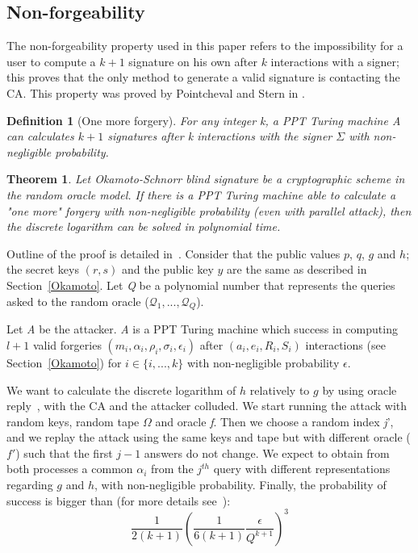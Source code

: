 \documentclass[conference]{IEEEtran}
\newtheorem{definition}{Definition}
\newtheorem{theorem}{Theorem}
\begin{document}
\subsection{Non-forgeability}
The non-forgeability property used in this paper refers to the impossibility for a user to compute a $k+1$ signature on his own after $k$ interactions with a signer; this proves that the only method to generate a valid signature is contacting the CA. This property was proved by Pointcheval and Stern in \cite{pointcheval1996provably}.

\begin{definition}[One more forgery]
For any integer \textit{k}, a PPT Turing machine \textit{A} can calculates $k+1$ signatures after \textit{k} interactions with the signer $\Sigma$ with non-negligible probability.  
\end{definition}

\begin{theorem}
Let Okamoto-Schnorr blind signature be a cryptographic scheme in the random oracle model. If there is a PPT Turing machine able to calculate a "one more" forgery with non-negligible probability (even with parallel attack), then the discrete logarithm can be solved in polynomial time.
\end{theorem}

\begin{IEEEproof}
Outline of the proof is detailed in~\cite{pointcheval1996provably}.
Consider that the public values $p$, $q$, $g$ and $h$; the secret keys $(r,s)$ and the public key $y$ are the same as described in Section~\ref{Okamoto}. Let \textit{Q} be a polynomial number that represents the queries asked to the random oracle ($\mathcal{Q}_1,...,\mathcal{Q}_Q$).

Let \textit{A} be the attacker. \textit{A} is a PPT Turing machine which success in computing  $l+1$ valid forgeries $(m_i,\alpha_i,\rho_i,\sigma_i,\epsilon_i)$ after $(a_i,e_i,R_i,S_i)$ interactions (see Section~\ref{Okamoto}) for $i\in\{i,...,k\}$ with non-negligible probability $\epsilon$.

We want to calculate the  discrete logarithm of $h$ relatively to $g$ by using oracle reply~\cite{10.1007/3-540-68339-9_33}, with the CA and the attacker colluded. We start running the attack with random keys, random tape $\Omega$ and oracle \textit{f}. Then we choose a random index \textit{j}', and we replay the attack using the same keys and tape but with different oracle ($f'$) such that the first $j-1$ answers do not change. We expect to obtain from both processes a common $\alpha_i$ from the $j^{th}$ query with different representations regarding $g$ and $h$, with non-negligible probability. Finally, the probability of success is bigger than (for more details see~\cite{pointcheval1996provably}):
\begin{equation}
    \frac{1}{2(k+1)}\left(\frac{1}{6(k+1)}\frac{\epsilon}{Q^{k+1}}\right)^3
\end{equation}
\end{IEEEproof}
\end{document}
